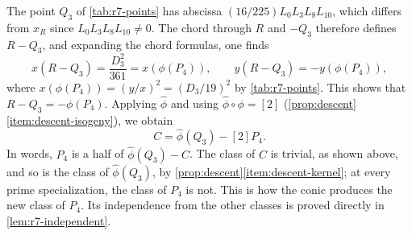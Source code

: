 \documentclass[12pt,oneside,openany]{book}
\theoremstyle{definition}
\theoremstyle{plain}
\numberwithin{equation}{chapter}
\theoremstyle{plain}
\theoremstyle{definition}
\theoremstyle{remark}
\newcommand{\dual}{\hat\phi}
\begin{document}
The point $Q_3$ of \cref{tab:r7-points} has abscissa
$(16/225)L_0L_3L_8L_{10}$, which differs from $x_R$ since $L_0L_3L_8L_{10}\ne0$.
The chord through $R$ and $-Q_3$ therefore defines $R-Q_3$, and expanding
the chord formulas, one finds
\[
 x(R-Q_3)=\frac{D_3^2}{361}=x(\phi(P_4)),\qquad y(R-Q_3)=-y(\phi(P_4)),
\]
where $x(\phi(P_4))=(y/x)^2=(D_3/19)^2$ by \cref{tab:r7-points}. This shows that
$R-Q_3=-\phi(P_4)$. Applying $\dual$ and using $\dual\circ\phi=[2]$
(\cref{prop:descent}\ref{item:descent-isogeny}), we obtain
\[
 C=\dual(Q_3)-[2]P_4.
\]
In words, $P_4$ is a half of $\dual(Q_3)-C$. The class of $C$ is trivial,
as shown above, and so is the class of $\dual(Q_3)$, by
\cref{prop:descent}\ref{item:descent-kernel}; at every prime
specialization, the class of $P_4$ is not.
This is how the conic produces the new class of $P_4$. Its
independence from the other classes is proved directly in
\cref{lem:r7-independent}.

\backmatter

\setlength{\bibsep}{3pt plus 1pt minus 1pt}


\end{document}
